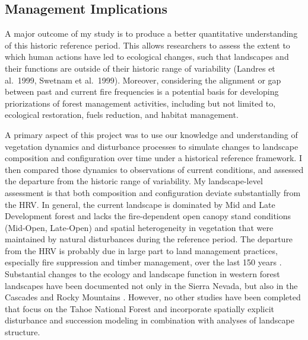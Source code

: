 
\clearpage
\subsection{Management Implications}

A major outcome of my study is to produce a better quantitative understanding of this historic reference period. This allows researchers to assess the extent to which human actions have led to ecological changes, such that landscapes and their functions are outside of their historic range of variability (Landres et al.\ 1999, Swetnam et al.\ 1999). Moreover, considering the alignment or gap between past and current fire frequencies is a potential basis for developing priorizations of forest management activities, including but not limited to, ecological restoration, fuels reduction, and habitat management. 



A primary aspect of this project was to use our knowledge and understanding of vegetation dynamics and disturbance processes to simulate changes to landscape composition and configuration over time under a historical reference framework. I then compared those dynamics to observations of current conditions, and assessed the departure from the historic range of variability. My landscape-level assessment is that both composition and configuration deviate substantially from the HRV. In general, the current landscape is dominated by Mid and Late Development forest and lacks the fire-dependent open canopy stand conditions (Mid-Open, Late-Open) and spatial heterogeneity in vegetation that were maintained by natural disturbances during the reference period. The departure from the HRV is probably due in large part to land management practices, especially fire suppression and timber management, over the last 150 years \citep{Safford2014,Stephens2007}. Substantial changes to the ecology and landscape function in western forest landscapes have been documented not only in the Sierra Nevada, but also in the Cascades and Rocky Mountains \citep{Hessburg2005,Baker2012,Baker2014,Mallek2013,Agee1993}. However, no other studies have been completed that focus on the Tahoe National Forest and incorporate spatially explicit disturbance and succession modeling in combination with analyses of landscape structure.

